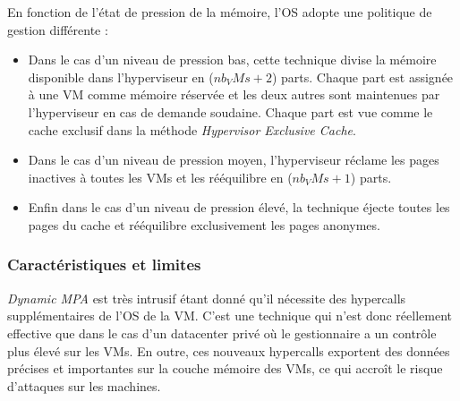 \noindent En fonction de l'état de pression de la mémoire, l'OS adopte une politique de gestion différente : 
\begin{itemize}
    \item Dans le cas d'un niveau de pression bas, cette technique divise la mémoire disponible dans l'hyperviseur en ($nb_VMs + 2$) parts. Chaque part est assignée à une VM comme mémoire réservée et les deux autres sont maintenues par l'hyperviseur en cas de demande soudaine. Chaque part est vue comme le cache exclusif dans la méthode \textit{Hypervisor Exclusive Cache}.
    \item Dans le cas d'un niveau de pression moyen, l'hyperviseur réclame les pages inactives à toutes les VMs et les rééquilibre en ($nb_VMs + 1$) parts.
    \item Enfin dans le cas d'un niveau de pression élevé, la technique éjecte toutes les pages du cache et rééquilibre exclusivement les pages anonymes.
\end{itemize}

\subsubsection{Caractéristiques et limites}
\textit{Dynamic MPA} est très intrusif étant donné qu'il nécessite des hypercalls supplémentaires de l'OS de la VM. C'est une technique qui n'est donc réellement effective que dans le cas d'un datacenter privé où le gestionnaire a un contrôle plus élevé sur les VMs. En outre, ces nouveaux hypercalls exportent des données précises et importantes sur la couche mémoire des VMs, ce qui accroît le risque d'attaques sur les machines.
